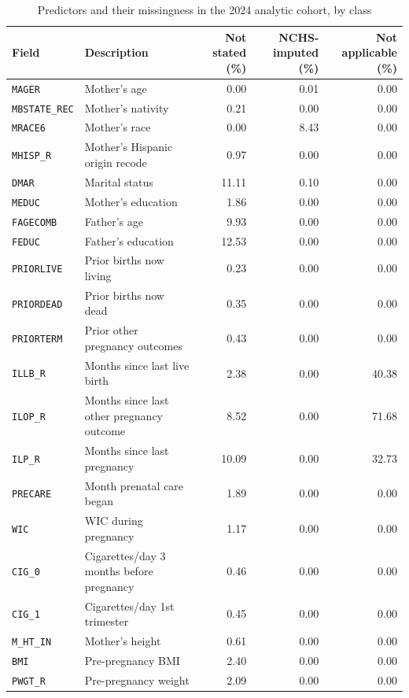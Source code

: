 \documentclass[journal]{IEEEtran}
\begin{document}
\begin{table}[!t]
\centering
\scriptsize
\caption{Predictors and their missingness in the 2024 analytic cohort, by class}
\label{tab:predictors}
\begin{tabular}{llrrr}
\toprule
\textbf{Field} & \textbf{Description} & \textbf{Not stated (\%)} & \textbf{NCHS-imputed (\%)} & \textbf{Not applicable (\%)} \\
\midrule
\texttt{MAGER} & Mother's age & 0.00 & 0.01 & 0.00 \\
\texttt{MBSTATE\_REC} & Mother's nativity & 0.21 & 0.00 & 0.00 \\
\texttt{MRACE6} & Mother's race & 0.00 & 8.43 & 0.00 \\
\texttt{MHISP\_R} & Mother's Hispanic origin recode & 0.97 & 0.00 & 0.00 \\
\texttt{DMAR} & Marital status & 11.11 & 0.10 & 0.00 \\
\texttt{MEDUC} & Mother's education & 1.86 & 0.00 & 0.00 \\
\texttt{FAGECOMB} & Father's age & 9.93 & 0.00 & 0.00 \\
\texttt{FEDUC} & Father's education & 12.53 & 0.00 & 0.00 \\
\texttt{PRIORLIVE} & Prior births now living & 0.23 & 0.00 & 0.00 \\
\texttt{PRIORDEAD} & Prior births now dead & 0.35 & 0.00 & 0.00 \\
\texttt{PRIORTERM} & Prior other pregnancy outcomes & 0.43 & 0.00 & 0.00 \\
\texttt{ILLB\_R} & Months since last live birth & 2.38 & 0.00 & 40.38 \\
\texttt{ILOP\_R} & Months since last other pregnancy outcome & 8.52 & 0.00 & 71.68 \\
\texttt{ILP\_R} & Months since last pregnancy & 10.09 & 0.00 & 32.73 \\
\texttt{PRECARE} & Month prenatal care began & 1.89 & 0.00 & 0.00 \\
\texttt{WIC} & WIC during pregnancy & 1.17 & 0.00 & 0.00 \\
\texttt{CIG\_0} & Cigarettes/day 3 months before pregnancy & 0.46 & 0.00 & 0.00 \\
\texttt{CIG\_1} & Cigarettes/day 1st trimester & 0.45 & 0.00 & 0.00 \\
\texttt{M\_HT\_IN} & Mother's height & 0.61 & 0.00 & 0.00 \\
\texttt{BMI} & Pre-pregnancy BMI & 2.40 & 0.00 & 0.00 \\
\texttt{PWGT\_R} & Pre-pregnancy weight & 2.09 & 0.00 & 0.00 \\

\end{tabular}
\end{table}
\end{document}
